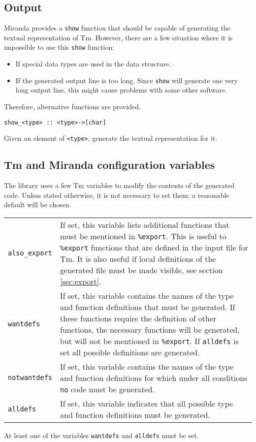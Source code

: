 \documentclass{article}
\makeatletter
\def\Tm{{\sf Tm}}
\def\Miranda{Miranda}
\newenvironment{desc}{\nopagebreak\vspace{-\bigskipamount}\vspace{-\parskip}\begin{list}{}{\setlength{\topsep}{0pt}\setlength{\rightmargin}{0pt}}\item[]}{\end{list}}
\newlength{\descwidth}
\newenvironment{desctab}{\begin{tabular*}{\textwidth}{l@{\extracolsep{\fill}}p{\descwidth}}}{\end{tabular*}}
\makeatother
\begin{document}
\subsection{Output}
{\Miranda} provides a {\tt show} function that should be capable of generating
the textual representation of {\Tm}.
However,
there are a few situation where it is impossible to use this
{\tt show} function:
\begin{itemize}
\item If special data types are used in the data structure.
\item If the generated output line is too long.
      Since {\tt show} will generate one very long output line,
      this might cause problems with some other software.
\end{itemize}
Therefore, alternative functions are provided.
\begin{verbatim}
show_<type> :: <type>->[char]
\end{verbatim}
\begin{desc}
Given an element of {\tt <type>},
generate the textual representation for it.
\end{desc}
\subsection{{\Tm} and {\Miranda} configuration variables}
\label{sec:miraconfig}
The library uses a few {\Tm} variables to modify the contents
of the generated code.
Unless stated otherwise,
it is not necessary to set them;
a reasonable default will be chosen.
\par
\begin{desctab}
{\tt also\_export}\index{also_export@{\verb+also_export+}}
&
If set,
this variable lists additional functions that must be mentioned
in {\tt \%export}.
This is useful to {\tt \%export} functions that are defined in the input
file for {\Tm}.
It is also useful if local definitions of the generated file
must be made visible, see section \ref{sec:export}.
\\
{\tt wantdefs}\index{wantdefs@{\verb+wantdefs+}}
&
If set,
this variable contains the names of the type and function definitions that
must be generated.
If these functions require the definition of other functions,
the necessary functions will be generated,
but will not be mentioned in {\tt \%export}.
If {\tt alldefs} is set all possible definitions are generated.
\\
{\tt notwantdefs}\index{notwantdefs@{\verb+notwantdefs+}}
&
If set,
this variable contains the names of the type and function definitions for
which under all conditions {\tt no} code must be generated.
\\
{\tt alldefs}\index{alldefs@{\tt alldefs}}
&
If set,
this variable indicates that all possible type and function definitions must
be generated.
\\
\end{desctab}
\par
At least one of the variables {\tt wantdefs} and {\tt alldefs} must be set.
\end{document}
